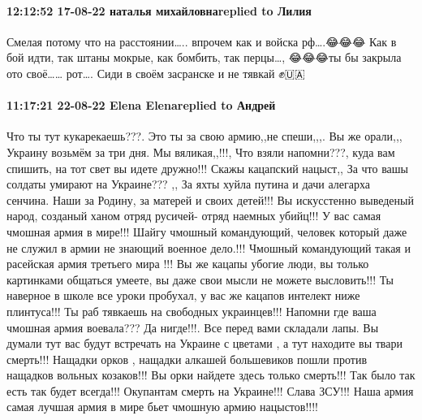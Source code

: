 \paragraph{12:12:52 17-08-22 наталья михайловнаreplied to Лилия}

Смелая потому что на расстоянии….. впрочем как и войска рф….😂😂😂 Как в бой
идти, так штаны мокрые, как бомбить, так перцы…, 😂😂😂ты бы закрыла ото своё……
рот…. Сиди в своём засранске и не тявкай ✊🇺🇦

\paragraph{11:17:21 22-08-22 Elena Elenareplied to Андрей}

Что ты тут кукарекаешь???. Это ты за свою армию,,не спеши,,,. Вы же орали,,,
Украину возьмём за три дня. Мы вяликая,,!!!, Что взяли напомни???, куда вам
спишить, на тот свет вы идете дружно!!! Скажы кацапский нацыст,, За что вашы
солдаты умирают на Украине??? ,, За яхты хуйла путина и дачи алегарха сенчина.
Наши за Родину, за матерей и своих детей!!! Вы искусстенно выведеный народ,
созданый ханом отряд русичей- отряд наемных убийц!!! У вас самая чмошная армия
в мире!!! Шайгу чмошный командующий, человек который даже не служил в армии не
знающий военное дело.!!! Чмошный командующий такая и расейская армия третьего
мира !!! Вы же кацапы убогие люди, вы только картинками общаться умеете, вы
даже свои мысли не можете высловить!!! Ты наверное в школе все уроки пробухал,
у вас же кацапов интелект ниже плинтуса!!! Ты раб тявкаешь на свободных
украинцев!!! Напомни где ваша чмошная армия воевала??? Да нигде!!!. Все перед
вами складали лапы. Вы думали тут вас будут встречать на Украине с цветами , а
тут находите вы твари смерть!!! Нащадки орков , нащадки алкашей большевиков
пошли против нащадков вольных козаков!!! Вы орки найдете здесь только смерть!!!
Так было так есть так будет всегда!!! Окупантам смерть на Украине!!! Слава
ЗСУ!!! Наша армия самая лучшая армия в мире бьет чмошную армию нацыстов!!!!

